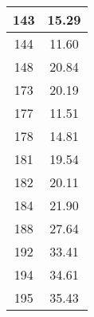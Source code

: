 \documentclass{article}
\begin{document}
\begin{table}[h]
\begin{tabular}{@{}cc@{}}
        143 & 15.29 \\ \hline
        144 & 11.60 \\ \hline
        148 & 20.84 \\ \hline
        173 & 20.19 \\ \hline
        177 & 11.51 \\ \hline
        178 & 14.81 \\ \hline
        181 & 19.54 \\ \hline
        182 & 20.11 \\ \hline
        184 & 21.90 \\ \hline
        188 & 27.64 \\ \hline
        192 & 33.41 \\ \hline
        194 & 34.61 \\ \hline
        195 & 35.43 \\ \hline
        \bottomrule
    \end{tabular}
    \label{tab:distances}
\end{table}
\end{document}
